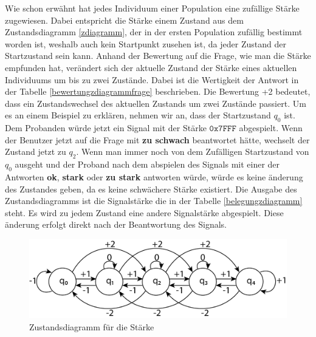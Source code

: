 Wie schon erw{\"a}hnt hat jedes Individuum einer Population eine zuf{\"a}llige St{\"a}rke zugewiesen.
Dabei entspricht die St{\"a}rke einem Zustand aus dem Zustandsdiagramm \autoref{zdiagramm}, der in der ersten Population zuf{\"a}llig bestimmt worden ist, weshalb auch kein Startpunkt zusehen ist, da jeder Zustand der Startzustand sein kann. Anhand der Bewertung auf die Frage, wie man die St{\"a}rke empfunden hat, ver{\"a}ndert sich der aktuelle Zustand der St{\"a}rke eines aktuellen Individuums um bis zu zwei Zust{\"a}nde. Dabei ist die Wertigkeit der Antwort in der Tabelle \autoref{bewertungzdiagrammfrage} beschrieben. 
Die Bewertung +2 bedeutet, dass ein Zustandswechsel des aktuellen Zustands um zwei Zust{\"a}nde passiert. 
Um es an einem Beispiel zu erkl{\"a}ren, nehmen wir an, dass der Startzustand $q_{0}$ ist. Dem Probanden w{\"u}rde jetzt ein Signal mit der St{\"a}rke $\mathtt{0x7FFF}$ abgespielt. Wenn der Benutzer jetzt auf die Frage mit \textbf{zu schwach} beantwortet h{\"a}tte, wechselt der Zustand jetzt zu $q_{2}$. Wenn man immer noch von dem Zuf{\"a}lligen Startzustand von $q_{0}$ ausgeht und der Proband nach dem abspielen des Signals mit einer der Antworten \textbf{ok}, \textbf{stark} oder \textbf{zu stark} antworten w{\"u}rde, w{\"u}rde es keine {\"a}nderung des Zustandes geben, da es keine schw{\"a}chere St{\"a}rke existiert. Die Ausgabe des Zustandsdiagramms ist die Signalst{\"a}rke die in der Tabelle \autoref{belegungzdiagramm} steht. Es wird zu jedem Zustand eine andere Signalst{\"a}rke abgespielt. Diese {\"a}nderung erfolgt direkt nach der Beantwortung des Signals. 

\begin{figure}
	\centering
    \includegraphics[width=\textwidth]{pics/entwurf/zdiagramm3.png}
    \caption{Zustandsdiagramm f{\"u}r die St{\"a}rke}
    \label{fig:zdiagramm}
\end{figure}

